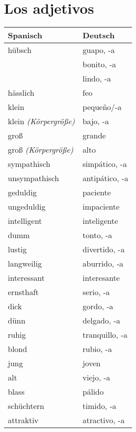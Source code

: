 \documentclass[10pt,spanish]{report}
\begin{document}
\chapter*{Los adjetivos}

\begin{longtable}{p{} | p{}} 
\textbf{Spanisch}     & \textbf{Deutsch}                                       \\ \hline
\hline
\endhead %
hübsch & guapo, -a\\
& bonito, -a\\
& lindo, -a\\
hässlich & feo\\
klein & peque\~{n}o/-a\\
klein \textit{(Körpergröße)} & bajo, -a\\
groß & grande\\
groß \textit{(Körpergröße)} & alto\\
sympathisch & simpático, -a\\
unsympathisch & antipático, -a\\
geduldig & paciente \\
ungeduldig & impaciente \\
intelligent & inteligente \\
dumm & tonto, -a\\
lustig & divertido, -a\\
langweilig & aburrido, -a\\
interessant & interesante\\
ernsthaft & serio, -a\\
dick & gordo, -a\\
dünn & delgado, -a\\
ruhig & tranquillo, -a\\
blond & rubio, -a\\
jung & joven\\
alt & viejo, -a\\
blass & pálido\\
schüchtern & timido, -a\\
attraktiv & atractivo, -a
\end{longtable}
\end{document}
